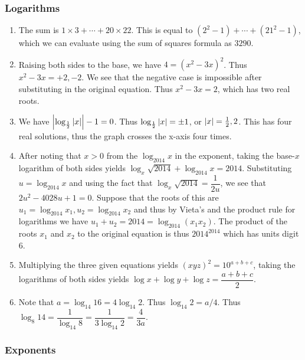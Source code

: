 \documentclass[10pt,paper=letter]{scrartcl}
\begin{document}
\subsubsection*{Logarithms}

\begin{enumerate}

\item The sum is $1\times 3 + \cdots + 20 \times 22$. This is equal to $(2^2 - 1) + \cdots + (21^2 - 1)$, which we can evaluate using the sum of squares formula as $3290$.

\item Raising both sides to the base, we have $4 = (x^2 - 3x)^2$. Thus $x^2 - 3x = +2, -2$. We see that the negative case is impossible after substituting in the original equation. Thus $x^2 - 3x = 2$, which has two real roots.

\item We have $\left\lvert \log_{\frac{1}{2}}\left\lvert x \right\rvert \right\rvert - 1 = 0$. Thus $\log_{\frac{1}{2}}\left\lvert x \right\rvert = \pm 1$, or $\left\lvert x \right\rvert = \frac{1}{2}, 2$. This has four real solutions, thus the graph crosses the x-axis four times.

\item After noting that $x > 0$ from the $\log_{2014}x$ in the exponent, taking the base-$x$ logarithm of both sides yields $\log_x\sqrt{2014} + \log_{2014}x = 2014$. Substituting $u = \log_{2014}x$ and using the fact that $\log_x\sqrt{2014} = \dfrac{1}{2u}$, we see that $2u^2 - 4028u + 1 = 0$. Suppose that the roots of this are $u_1 = \log_{2014}x_1, u_2 = \log_{2014}x_2$ and thus by Vieta's and the product rule for logarithms we have $u_1 + u_2 = 2014 = \log_{2014}(x_1x_2)$. The product of the roots $x_1$ and $x_2$ to the original equation is thus $2014^{2014}$ which has units digit $6$.

\item Multiplying the three given equations yields $(xyz)^2 = 10^{a+b+c}$, taking the logarithms of both sides yields $\log x + \log y + \log z = \dfrac{a+b+c}{2}$.

\item Note that $a = \log_{14}16 = 4\log_{14}2$. Thus $\log_{14}2 = a/4$. Thus $\log_8 14 = \dfrac{1}{\log_{14} 8} = \dfrac{1}{3\log_{14} 2} = \dfrac{4}{3a}$.

\end{enumerate}

\subsubsection*{Exponents}
\end{document}

